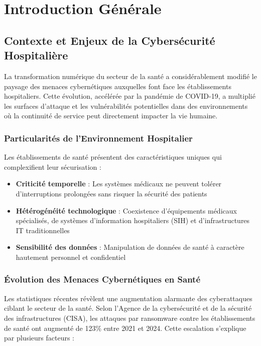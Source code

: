 \chapter{Introduction Générale}

\section{Contexte et Enjeux de la Cybersécurité Hospitalière}

La transformation numérique du secteur de la santé a considérablement modifié le paysage des menaces cybernétiques auxquelles font face les établissements hospitaliers. Cette évolution, accélérée par la pandémie de COVID-19, a multiplié les surfaces d'attaque et les vulnérabilités potentielles dans des environnements où la continuité de service peut directement impacter la vie humaine.

\subsection{Particularités de l'Environnement Hospitalier}

Les établissements de santé présentent des caractéristiques uniques qui complexifient leur sécurisation :

\begin{itemize}
    \item \textbf{Criticité temporelle} : Les systèmes médicaux ne peuvent tolérer d'interruptions prolongées sans risquer la sécurité des patients
    \item \textbf{Hétérogénéité technologique} : Coexistence d'équipements médicaux spécialisés, de systèmes d'information hospitaliers (SIH) et d'infrastructures IT traditionnelles
    \item \textbf{Sensibilité des données} : Manipulation de données de santé à caractère hautement personnel et confidentiel
\end{itemize}

\subsection{Évolution des Menaces Cybernétiques en Santé}

Les statistiques récentes révèlent une augmentation alarmante des cyberattaques ciblant le secteur de la santé. Selon l'Agence de la cybersécurité et de la sécurité des infrastructures (CISA), les attaques par ransomware contre les établissements de santé ont augmenté de 123\% entre 2021 et 2024. Cette escalation s'explique par plusieurs facteurs :

